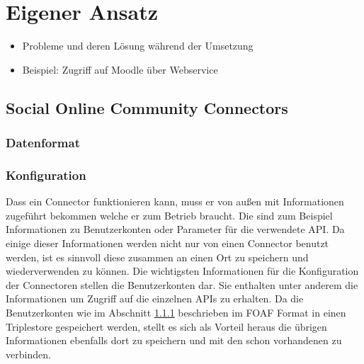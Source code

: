 
\chapter{Eigener Ansatz} %
\label{cha:eigener_ansatz}


\begin{itemize}
    \item Probleme und deren Lösung während der Umsetzung
    \item Beispiel: Zugriff auf Moodle über Webservice
\end{itemize}



\section{Social Online Community Connectors} %
\label{sec:social_online_community_connectors}

\subsection{Datenformat} %
\label{sub:datenformat}


\subsection{Konfiguration} %
\label{sub:konfiguration}



Dass ein Connector funktionieren kann, muss er von außen mit Informationen zugeführt bekommen welche er zum Betrieb braucht. Die sind zum Beispiel Informationen zu Benutzerkonten oder Parameter für die verwendete API. Da einige dieser Informationen werden nicht nur von einen Connector benutzt werden, ist es sinnvoll diese zusammen an einen Ort zu speichern und wiederverwenden zu können. Die wichtigsten Informationen für die Konfiguration der Connectoren stellen die Benutzerkonten dar. Sie enthalten unter anderem die Informationen um Zugriff auf die einzelnen APIs zu erhalten. Da die Benutzerkonten wie im Abschnitt \ref{sub:datenformat} beschrieben im FOAF Format in einen Triplestore gespeichert werden, stellt es sich als Vorteil heraus die übrigen Informationen ebenfalls dort zu speichern und mit den schon vorhandenen zu verbinden. 

